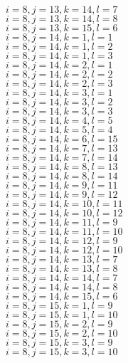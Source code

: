 \documentclass[14pt]{article}
\begin{document}
    $i=8,j=13,k=14,l=7 $ \\ 
    $i=8,j=13,k=14,l=8 $ \\ 
    $i=8,j=13,k=15,l=6 $ \\ 
    $i=8,j=14,k=1,l=1 $ \\ 
    $i=8,j=14,k=1,l=2 $ \\ 
    $i=8,j=14,k=1,l=3 $ \\ 
    $i=8,j=14,k=2,l=1 $ \\ 
    $i=8,j=14,k=2,l=2 $ \\ 
    $i=8,j=14,k=2,l=3 $ \\ 
    $i=8,j=14,k=3,l=1 $ \\ 
    $i=8,j=14,k=3,l=2 $ \\ 
    $i=8,j=14,k=3,l=3 $ \\ 
    $i=8,j=14,k=4,l=5 $ \\ 
    $i=8,j=14,k=5,l=4 $ \\ 
    $i=8,j=14,k=6,l=15 $ \\ 
    $i=8,j=14,k=7,l=13 $ \\ 
    $i=8,j=14,k=7,l=14 $ \\ 
    $i=8,j=14,k=8,l=13 $ \\ 
    $i=8,j=14,k=8,l=14 $ \\ 
    $i=8,j=14,k=9,l=11 $ \\ 
    $i=8,j=14,k=9,l=12 $ \\ 
    $i=8,j=14,k=10,l=11 $ \\ 
    $i=8,j=14,k=10,l=12 $ \\ 
    $i=8,j=14,k=11,l=9 $ \\ 
    $i=8,j=14,k=11,l=10 $ \\ 
    $i=8,j=14,k=12,l=9 $ \\ 
    $i=8,j=14,k=12,l=10 $ \\ 
    $i=8,j=14,k=13,l=7 $ \\ 
    $i=8,j=14,k=13,l=8 $ \\ 
    $i=8,j=14,k=14,l=7 $ \\ 
    $i=8,j=14,k=14,l=8 $ \\ 
    $i=8,j=14,k=15,l=6 $ \\ 
    $i=8,j=15,k=1,l=9 $ \\ 
    $i=8,j=15,k=1,l=10 $ \\ 
    $i=8,j=15,k=2,l=9 $ \\ 
    $i=8,j=15,k=2,l=10 $ \\ 
    $i=8,j=15,k=3,l=9 $ \\ 
    $i=8,j=15,k=3,l=10 $ \\ 
\end{document}
